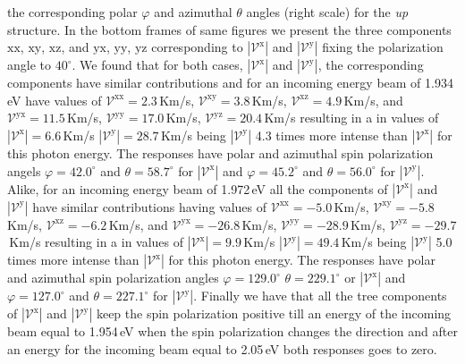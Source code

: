 \documentclass[prb,11pt,tightenlines,twocolumn,aps]{revtex4-1}
\begin{document}
the corresponding polar $\varphi$ and azimuthal $\theta$ angles (right scale)
for the \emph{up} structure. In the bottom frames of same figures we present the
three components $\mathrm{xx}$, $\mathrm{xy}$, $\mathrm{xz}$, and $\mathrm{yx}$,
$\mathrm{yy}$, $\mathrm{yz}$ corresponding to $|\mathcal{V}^{\mathrm{x}}|$ and
$|\mathcal{V}^{\mathrm{y}}|$ fixing the polarization angle to $40^{\circ}$.
We found that for both cases, $|\mathcal{V}^{\mathrm{x}}|$ and
$|\mathcal{V}^{\mathrm{y}}|$, the corresponding components have similar
contributions and for an incoming energy beam of 1.934\,eV have values of
% 
$\mathcal{V}^{\mathrm{xx}}= 2.3$\,Km/s, 
$\mathcal{V}^{\mathrm{xy}}= 3.8$\,Km/s, 
$\mathcal{V}^{\mathrm{xz}}= 4.9$\,Km/s, and
$\mathcal{V}^{\mathrm{yx}}=11.5$\,Km/s,
$\mathcal{V}^{\mathrm{yy}}=17.0$\,Km/s,
$\mathcal{V}^{\mathrm{yz}}=20.4$\,Km/s
resulting in a in values of 
$|\mathcal{V}^{\mathrm{x}}|= 6.6$\,Km/s
$|\mathcal{V}^{\mathrm{y}}|=28.7$\,Km/s
% 
being $|\mathcal{V}^{\mathrm{y}}|$ 4.3 times more intense than
$|\mathcal{V}^{\mathrm{x}}|$ for this photon energy. The responses have polar
and azimuthal spin polarization angels $\varphi= 42.0^{\circ}$ and $\theta=
58.7^{\circ}$ for $|\mathcal{V}^{\mathrm{x}}|$ and $\varphi= 45.2^{\circ}$ and
$\theta= 56.0^{\circ}$ for $|\mathcal{V}^{\mathrm{y}}|$.
% 
Alike, for an incoming energy beam of 1.972\,eV all the components of
$|\mathcal{V}^{\mathrm{x}}|$ and $|\mathcal{V}^{\mathrm{y}}|$ have similar
contributions having values of
% 
$\mathcal{V}^{\mathrm{xx}}= -5.0$\,Km/s, 
$\mathcal{V}^{\mathrm{xy}}= -5.8$\,Km/s, 
$\mathcal{V}^{\mathrm{xz}}= -6.2$\,Km/s, and
$\mathcal{V}^{\mathrm{yx}}=-26.8$\,Km/s,
$\mathcal{V}^{\mathrm{yy}}=-28.9$\,Km/s,
$\mathcal{V}^{\mathrm{yz}}=-29.7$\,Km/s
resulting in a in values of 
$|\mathcal{V}^{\mathrm{x}}|= 9.9$\,Km/s
$|\mathcal{V}^{\mathrm{y}}|=49.4$\,Km/s
% 
being $|\mathcal{V}^{\mathrm{y}}|$ 5.0 times more intense than
$|\mathcal{V}^{\mathrm{x}}|$ for this photon energy. The responses have polar
and azimuthal spin polarization angles $\varphi=129.0^{\circ}$
$\theta=229.1^{\circ}$ or $|\mathcal{V}^{\mathrm{x}}|$ and
$\varphi=127.0^{\circ}$ and $\theta= 227.1^{\circ}$ for
$|\mathcal{V}^{\mathrm{y}}|$.
% 
Finally we have that all the tree components of $|\mathcal{V}^{\mathrm{x}}|$ and
$|\mathcal{V}^{\mathrm{y}}|$ keep the spin polarization positive till an energy
of the incoming beam equal to 1.954\,eV when the spin polarization changes the
direction and after an energy for the incoming beam equal to 2.05\,eV both
responses goes to zero.
\end{document}
